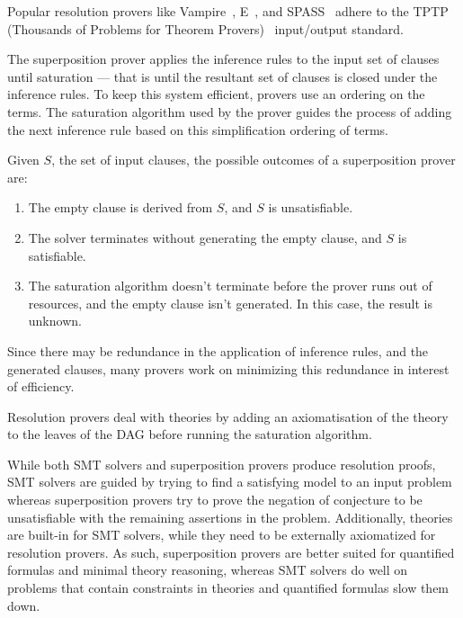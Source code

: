 \documentclass{article}
\begin{document}
	Popular resolution provers like 
	Vampire~\cite{10.1007/978-3-642-39799-8_1}, 
	E~\cite{10.5555/1218615.1218621}, and 
	SPASS~\cite{10.1007/978-3-642-02959-2_10} adhere 
	to the TPTP (Thousands of Problems 
	for Theorem 
	Provers)~\cite{Sut17} input/output standard.
	
	The superposition prover applies the inference 
	rules to the input set of 
	clauses until saturation --- that is until the 
	resultant set of clauses is closed under the 
	inference rules. To keep this system
	efficient, provers use an ordering 
	on the terms. The saturation algorithm used 
	by the prover guides the process of adding the 
	next inference rule based on this simplification 
	ordering of terms.
	
	Given $S$, the set of input clauses, the possible 
	outcomes of a superposition prover are:
	\begin{enumerate}
		\item The empty clause is derived from $S$, and
		$S$ is unsatisfiable.
		\item The solver terminates without generating the 
		empty clause, and $S$ is satisfiable.
		\item The saturation algorithm doesn't terminate 
		before the prover runs out of resources, and 
		the empty clause isn't generated. In this 
		case, the result is unknown. 
	\end{enumerate}
	
	Since there may be redundance in the application 
	of inference rules, and the generated clauses, 
	many provers work on minimizing this redundance in 
	interest of efficiency.
	
	Resolution provers deal with theories by 
	adding an axiomatisation of the theory to the 
	leaves of the DAG before running the 
	saturation algorithm.
	
	While both SMT solvers and superposition provers 
	produce resolution proofs, SMT solvers are guided 
	by trying to find a satisfying model to an input 
	problem whereas superposition provers try 
	to prove the negation of conjecture to be unsatisfiable
	with the remaining assertions in the problem. 
	Additionally, theories are built-in for SMT solvers,
	while they need to be externally axiomatized for 
	resolution provers. As such, superposition provers
	are better suited for quantified formulas and 
	minimal theory reasoning, whereas SMT solvers 
	do well on problems that contain constraints 
	in theories and quantified formulas slow them 
	down.
	
\end{document}
